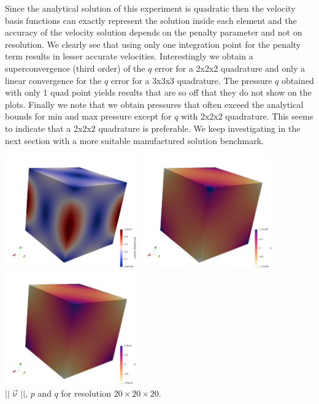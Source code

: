 Since the analytical solution of this experiment is quadratic then the 
velocity basis functions can exactly represent the solution inside each
element and the accuracy of the velocity solution depends on the penalty parameter and
not on resolution.
We clearly see that using only one integration point for the penalty term results
in lesser accurate velocities.
Interestingly we obtain a superconvergence (third order) of the $q$ error 
for a 2x2x2 quadrature and only a linear convergence for the $q$ error
for a 3x3x3 quadrature.
The pressure $q$ obtained with only 1 quad point yields results that are so off
that they do not show on the plots.
Finally we note that we obtain pressures that often exceed the analytical 
bounds for min and max pressure except for $q$ with 2x2x2 quadrature.
This seems to indicate that a 2x2x2 quadrature is preferable.
We keep investigating in the next section with a more suitable manufactured
solution benchmark.

\begin{center}
\includegraphics[width=5.7cm]{python_codes/fieldstone_10/resultsQ2/exp5/vel}
\includegraphics[width=5.7cm]{python_codes/fieldstone_10/resultsQ2/exp5/p}
\includegraphics[width=5.7cm]{python_codes/fieldstone_10/resultsQ2/exp5/q}\\
{\captionfont $||\vec\upnu||$, $p$ and $q$ for resolution $20\times 20 \times 20$.}
\end{center}

